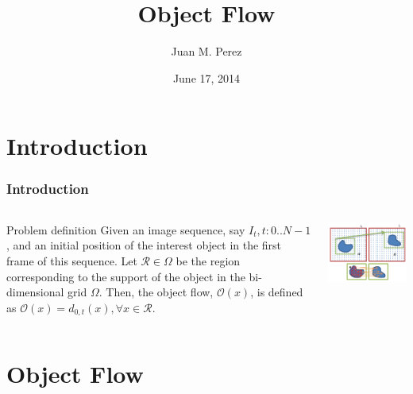 \documentclass{beamer}
\title{Object Flow}
\author{Juan M. Perez}
\date{June 17, 2014}
\institute[2014]{Technicolor}
\begin{document}
\frame{\titlepage}

\section[Outline]{}
\frame{\tableofcontents}

\section{Introduction}

\begin{frame}
	\frametitle{Introduction}
  \begin{columns}[T]
    \begin{column}{.5\textwidth}
		\begin{block}{Problem definition}
Given an image sequence, say $I_t, t:0..N-1$, and an initial position of the interest object in the first frame of this sequence. Let $\mathcal{R} \in \Omega$ be the region corresponding to the support of the object in the bi-dimensional grid $\Omega$. Then, the object flow, $\mathcal{O}(x)$,  is defined as $\mathcal{O}(x) = d_{0,t}(x), \forall x \in \mathcal{R}$.		
		\end{block}
    \end{column}
    \begin{column}{.5\textwidth}
		\includegraphics[width=1.0\textwidth]{../images/diagram.png}
    \end{column}
  \end{columns}
\end{frame}

\section{Object Flow}
\end{document}
